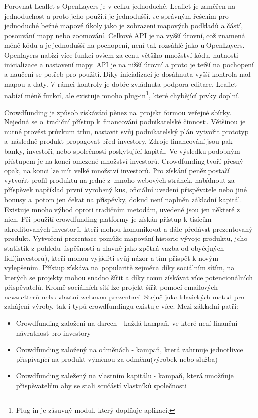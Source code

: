 \documentclass[12pt]{article}%
\begin{document}
{{
Porovnat Leaflet s OpenLayers je v celku jednoduché. Leaflet je zaměřen na jednoduchost a proto 
jeho použití je jednodušší. Je správným řešením pro jednoduché bežné mapové úkoly jako je zobrazení 
mapových podkladů a částí, posouvání mapy nebo zoomování. Celkové API je na vyšší úrovní, což 
znamená méně kódu a je jednodušší na pochopení, není tak rozsáhlé jako u OpenLayers. Openlayers 
nabízí více funkcí ovšem za cenu většího množství kódu, nutnosti inicializace a nastavení mapy. 
API je na nižší úrovní a proto je težší na pochopení a naučení se potřeb pro použití.
Díky inicializaci je dosáhnuta vyšší kontrola nad mapou a daty. V rámci kontroly je dobře zvládnuta 
podpora editace. Leaflet nabízí méně funkcí, ale existuje mnoho plug-in\footnote{Plug-in je 
zásuvný modul, který doplňuje aplikaci.}, které chybějící prvky doplní.

Crowdfunding je způsob získávání pěnez na~projekt formou veřejné sbírky. Nejedná se o~tradiční 
přístup k~financování podnikatelské činnosti. Většinou je nutné provést průzkum trhu, nastavit 
svůj podnikatelský plán vytvořit prototyp a~následně produkt propagovat před investory. Zdroje 
financování jsou pak banky, investoři, nebo společnosti poskytující kapitál. Ve výsledku podobným 
přístupem je na konci omezené množství investorů. Crowdfunding tvoří přesný opak, na konci lze mít 
velké množství investorů. Pro získání peněz postačí vytvořit profil produktu na jedné z~mnoho 
webových stránek, nabídnout za příspěvek například první vyrobený kus, oficiální uvedení 
přispěvatele nebo jiné bonusy a~potom jen čekat na příspěvky, dokud není naplněn základní kapitál.
Existuje mnoho výhod oproti tradičním metodám, uvedené jsou jen některé z nich. Při použití 
crowdfunding platformy je získán přístup k tisícům akreditovaných investorů, kteří mohou 
komunikovat a dále předávat prezentovaný produkt. Vytvoření prezentace pomůže mapování historie 
vývoje produktu, jeho statistik z pohledu úspěšnosti a hlavně jako zpětná vazba od obyčejných 
lidí(investorů), kteří mohou vyjádřti svůj názor a tím přispět k novým vylepšením. Přístup 
získáva na~popularitě zejména díky sociálním sítím, na kterých se projekty mohou snadno šířit 
a díky tomu získávat více potencionálních přispěvatelů. Kromě sociálních sítí lze projekt šířit 
pomocí emailových newsletterů nebo vlastní webovou prezentací. 
Stejně jako klasických metod pro zahájení výroby, tak i typů crowdfundingu existuje více. Mezi 
základní patří:
\begin{itemize}
\item Crowdfunding založení na darech - každá kampaň, ve které není finanční návratnost pro 
investory
\item Crowdfunding založený na odměnách - kampaň, která zahrnuje jednotlivce přispívající 
na produkt výměnou za odměnu(výrobek nebo služba)
\item Crowdfunding zaležený na vlastním kapitálu - kampaň, která umožňuje přispěvatelům aby 
se stali součástí vlastníků společnosti
\end{itemize}

}}
\end{document}
